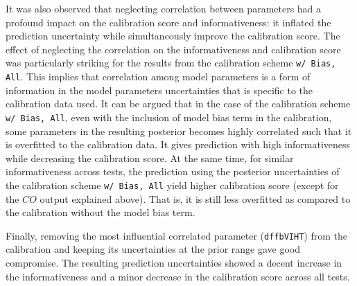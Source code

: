 It was also observed that neglecting correlation between parameters had a profound impact on the calibration score and informativeness: it inflated the prediction uncertainty while simultaneously improve the calibration score.
The effect of neglecting the correlation on the informativeness and calibration score was particularly striking for the results from the calibration scheme \texttt{w/ Bias, All}.
This implies that correlation among model parameters is a form of information in the model parameters uncertainties that is specific to the calibration data used.
It can be argued that in the case of the calibration scheme \texttt{w/ Bias, All}, even with the inclusion of model bias term in the calibration, some parameters in the resulting posterior becomes highly correlated such that it is overfitted to the calibration data.
It gives prediction with high informativeness while decreasing the calibration score.
At the same time, for similar informativeness across tests, the prediction using the posterior uncertainties of the calibration scheme \texttt{w/ Bias, All} yield higher calibration score (except for the $CO$ output explained above).
That is, it is still less overfitted as compared to the calibration without the model bias term.

Finally, removing the most influential correlated parameter (\texttt{dffbVIHT}) from the calibration and keeping its uncertainties at the prior range gave good compromise.
The resulting prediction uncertainties showed a decent increase in the informativeness and a minor decrease in the calibration score across all tests.


